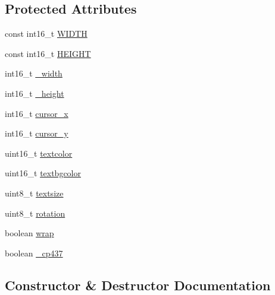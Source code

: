 \subsection*{Protected Attributes}
\begin{DoxyCompactItemize}
\item 
const int16\+\_\+t \hyperlink{class_adafruit___g_f_x_ab693a8ac5d94c50c2558b5a3795ddde4}{W\+I\+D\+TH}
\item 
const int16\+\_\+t \hyperlink{class_adafruit___g_f_x_a6b3665babcb73df381563016e9f71bdb}{H\+E\+I\+G\+HT}
\item 
int16\+\_\+t \hyperlink{class_adafruit___g_f_x_ab237f850a033492f5e745d79405a097a}{\+\_\+width}
\item 
int16\+\_\+t \hyperlink{class_adafruit___g_f_x_ab9bb0cbc2455f64dce2a5ec36307aa94}{\+\_\+height}
\item 
int16\+\_\+t \hyperlink{class_adafruit___g_f_x_a8f8983cea8d81a7c8e9d05eef36318e2}{cursor\+\_\+x}
\item 
int16\+\_\+t \hyperlink{class_adafruit___g_f_x_aebe0a38f6e6fd59cb81620c4696286c9}{cursor\+\_\+y}
\item 
uint16\+\_\+t \hyperlink{class_adafruit___g_f_x_a8c6d23a386651136fd9530a5b7046591}{textcolor}
\item 
uint16\+\_\+t \hyperlink{class_adafruit___g_f_x_a23e7a4efcab0b1588dc0cafa14b1fac1}{textbgcolor}
\item 
uint8\+\_\+t \hyperlink{class_adafruit___g_f_x_ac293848b8fe8c46107d1a491f6a5168d}{textsize}
\item 
uint8\+\_\+t \hyperlink{class_adafruit___g_f_x_a37a479d28fb11906ce516e983b1af926}{rotation}
\item 
boolean \hyperlink{class_adafruit___g_f_x_ad6bd603e01861212829d536312a7190b}{wrap}
\item 
boolean \hyperlink{class_adafruit___g_f_x_aaef3d4d239641084cd3825a8b1042e01}{\+\_\+cp437}
\end{DoxyCompactItemize}


\subsection{Constructor \& Destructor Documentation}
\mbox{\label{class_adafruit___g_f_x_a6f6f1abccf677eac244fa17d105133ea}} 
